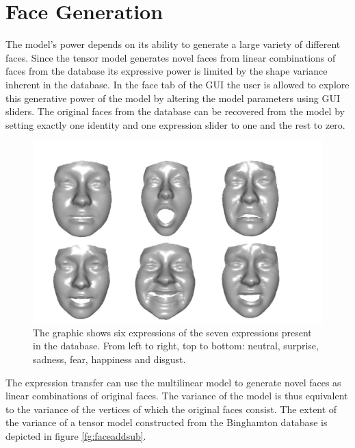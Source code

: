 \documentclass[11pt,a4paper,twoside]{report}
\begin{document}
\section{Face Generation}
The model's power depends on its ability to generate a large variety of
different faces. Since the tensor model generates novel faces from linear
combinations of faces from the database its expressive power is limited by the
shape variance inherent in the database. In the face tab of the GUI the user is
allowed to explore this generative power of the model by altering the model
parameters using GUI sliders. The original faces from the database can be
recovered from the model by setting exactly one identity and one expression
slider to one and the rest to zero. 
\begin{figure}[H]
\begin{centering}
\includegraphics[scale=0.33]{images/faces_generated.png}
\par\end{centering}

\caption{The graphic shows six expressions of the seven
  expressions present in the database. From left to
  right, top to bottom: neutral, surprise, sadness, fear, happiness and disgust.}
\label{fg:facegen}
\end{figure}
 
The expression transfer can use the multilinear model to generate novel faces as
linear combinations of original faces. The variance of the model is thus
equivalent to the variance of the vertices of which the original faces consist. The extent of the variance of a tensor model constructed from the Binghamton database is depicted in figure \ref{fg:faceaddsub}.
\end{document}
